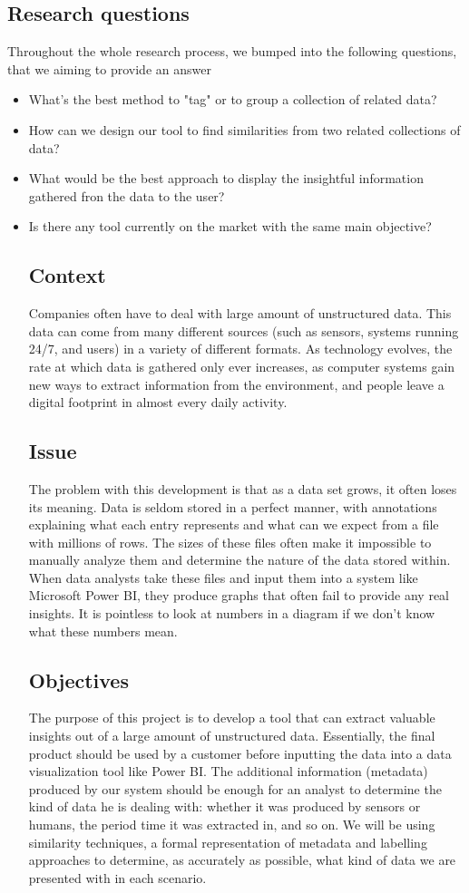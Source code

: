 \subsection{Research questions}
Throughout the whole research process, we bumped into the following questions, that we aiming to provide an answer 
\begin{itemize}
    \item What's the best method to "tag" or to group a collection of related data?
    \item How can we design our tool to find similarities from two related collections of data?
    \item What would be the best approach to display the insightful information gathered fron the data to the user?
    \item Is there any tool currently on the market with the same main objective?

\subsection{Context}
Companies often have to deal with large amount of unstructured data.
This data can come from many different sources (such as sensors, systems running 24/7, and users) in a variety of
different formats.
As technology evolves, the rate at which data is gathered only ever increases, as computer systems gain new ways to
extract information from the environment, and people leave a digital footprint in almost every daily activity.

\subsection{Issue}
The problem with this development is that as a data set grows, it often loses its meaning.
Data is seldom stored in a perfect manner, with annotations explaining what each entry represents and what can we
expect from a file with millions of rows.
The sizes of these files often make it impossible to manually analyze them and determine the nature of the data stored within.
When data analysts take these files and input them into a system like Microsoft Power BI, they produce graphs that often fail to
provide any real insights. 
It is pointless to look at numbers in a diagram if we don't know what these numbers mean.

\subsection{Objectives}
The purpose of this project is to develop a tool that can extract valuable insights out of a large amount of unstructured data.
Essentially, the final product should be used by a customer before inputting the data into a data visualization tool like Power BI.
The additional information (metadata) produced by our system should be enough for an analyst to determine the kind of data
he is dealing with: whether it was produced by sensors or humans, the period time it was extracted in, and so on.
We will be using similarity techniques, a formal representation of metadata and labelling approaches to determine, as
accurately as possible, what kind of data we are presented with in each scenario.


\end{itemize}
